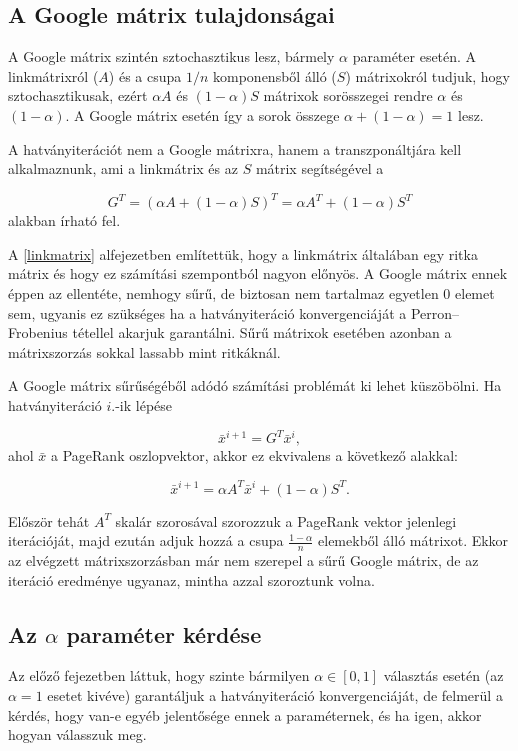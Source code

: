 \documentclass[12pt,a4paper]{article}
\begin{document}
\subsection{A Google mátrix tulajdonságai}\label{google_matrix_tul}

A Google mátrix szintén sztochasztikus lesz, bármely $\alpha$ paraméter esetén. A linkmátrixról ($A$) és a csupa $1/n$ komponensből álló ($S$) mátrixokról tudjuk, hogy sztochasztikusak, ezért $\alpha A$ és $(1-\alpha)S$ mátrixok sorösszegei rendre $\alpha$ és $(1-\alpha)$. A Google mátrix esetén így a sorok összege $\alpha+(1-\alpha) = 1$ lesz.

A hatványiterációt nem a Google mátrixra, hanem a transzponáltjára kell alkalmaznunk, ami a linkmátrix és az $S$ mátrix segítségével a 

\[ G^T = (\alpha A + (1-\alpha)S)^T = \alpha A^T + (1-\alpha) S^T \]
alakban írható fel.

\vspace{0.2cm}

A \ref{linkmatrix} alfejezetben említettük, hogy a linkmátrix általában egy ritka mátrix és hogy ez számítási szempontból nagyon előnyös. A Google mátrix ennek éppen az ellentéte, nemhogy sűrű, de biztosan nem tartalmaz egyetlen 0 elemet sem, ugyanis ez szükséges ha a hatványiteráció konvergenciáját a Perron–Frobenius tétellel akarjuk garantálni. Sűrű mátrixok esetében azonban a mátrixszorzás sokkal lassabb mint ritkáknál.

A Google mátrix sűrűségéből adódó számítási problémát ki lehet küszöbölni. Ha hatványiteráció $i$.-ik lépése

\[ \bar{x}^{i+1} = G^T \bar{x}^i, \]
ahol $\bar{x}$ a PageRank oszlopvektor, akkor ez ekvivalens a következő alakkal:

\[ \bar{x}^{i+1} = \alpha A^T \bar{x}^i + (1-\alpha) S^T. \] 

Először tehát $A^T$ skalár szorosával szorozzuk a PageRank vektor jelenlegi iterációját, majd ezután adjuk hozzá a csupa $\frac{1-\alpha}{n}$ elemekből álló mátrixot. Ekkor az elvégzett mátrixszorzásban már nem szerepel a sűrű Google mátrix, de az iteráció eredménye ugyanaz, mintha azzal szoroztunk volna. 

\subsection{Az $\alpha$ paraméter kérdése}

Az előző fejezetben láttuk, hogy szinte bármilyen $\alpha \in [0,1]$ választás esetén (az $\alpha=1$ esetet kivéve) garantáljuk a hatványiteráció konvergenciáját, de felmerül a kérdés, hogy van-e egyéb jelentősége ennek a paraméternek, és ha igen, akkor hogyan válasszuk meg.
\end{document}

